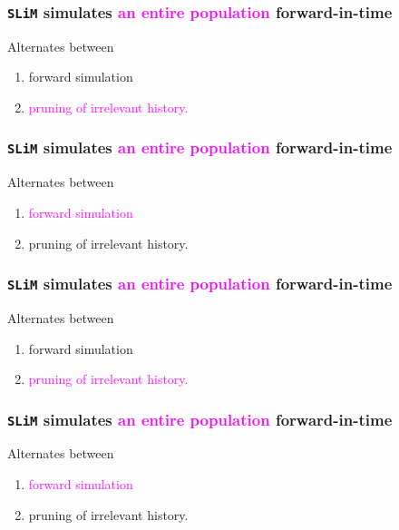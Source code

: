 \documentclass[11pt, mathserif, aspectratio=169]{beamer}
\newcommand{\magenta}[1]{\textcolor{magenta}{#1}}
\begin{document}
\begin{frame}
\frametitle{\texttt{SLiM} simulates \magenta{an entire population} forward-in-time}
\begin{minipage}{.58\textwidth}

\end{minipage}\hfill
\begin{minipage}{.4\textwidth}
Alternates between
\begin{enumerate}
\item forward simulation
\item \magenta{pruning of irrelevant history.}
\end{enumerate}
\end{minipage}
\end{frame}

\begin{frame}
\frametitle{\texttt{SLiM} simulates \magenta{an entire population} forward-in-time}
\begin{minipage}{.58\textwidth}

\end{minipage}\hfill
\begin{minipage}{.4\textwidth}
Alternates between
\begin{enumerate}
\item \magenta{forward simulation}
\item pruning of irrelevant history.
\end{enumerate}
\end{minipage}
\end{frame}

\begin{frame}
\frametitle{\texttt{SLiM} simulates \magenta{an entire population} forward-in-time}
\begin{minipage}{.58\textwidth}

\end{minipage}\hfill
\begin{minipage}{.4\textwidth}
Alternates between
\begin{enumerate}
\item forward simulation
\item \magenta{pruning of irrelevant history.}
\end{enumerate}
\end{minipage}
\end{frame}

\begin{frame}
\frametitle{\texttt{SLiM} simulates \magenta{an entire population} forward-in-time}
\begin{minipage}{.58\textwidth}

\end{minipage}\hfill
\begin{minipage}{.4\textwidth}
Alternates between
\begin{enumerate}
\item \magenta{forward simulation}
\item pruning of irrelevant history.
\end{enumerate}
\end{minipage}
\end{frame}
\end{document}
